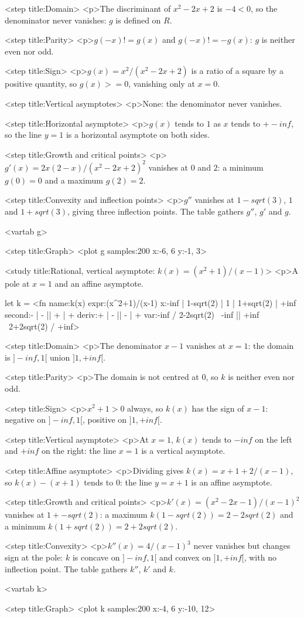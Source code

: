 \documentclass[margins=15, size=12, lang=en]{scholatex}
\begin{document}
<step title:{Domain}>{
<p>The discriminant of $x^2 - 2x + 2$ is $-4 < 0$, so the denominator
never vanishes: $g$ is defined on $R$.
}

<step title:{Parity}>{
<p>$g(-x) != g(x)$ and $g(-x) != -g(x)$: $g$ is neither even nor
odd.
}

<step title:{Sign}>{
<p>$g(x) = x^2 / (x^2 - 2x + 2)$ is a ratio of a square by a positive
quantity, so $g(x) >= 0$, vanishing only at $x = 0$.
}

<step title:{Vertical asymptotes}>{
<p>None: the denominator never vanishes.
}

<step title:{Horizontal asymptote}>{
<p>$g(x)$ tends to $1$ as $x$ tends to $+- inf$, so the line $y = 1$
is a horizontal asymptote on both sides.
}

<step title:{Growth and critical points}>{
<p>$g'(x) = 2x(2-x)/(x^2-2x+2)^2$ vanishes at $0$ and $2$: a minimum
$g(0) = 0$ and a maximum $g(2) = 2$.
}

<step title:{Convexity and inflection points}>{
<p>$g''$ vanishes at $1-sqrt(3)$, $1$ and $1+sqrt(3)$, giving three
inflection points. The table gathers $g''$, $g'$ and $g$.
}

<vartab g>

<step title:{Graph}>{
<plot g samples:200 x:{-6, 6} y:{-1, 3}>
}

<study title:{Rational, vertical asymptote: $k(x) = (x^2+1)/(x-1)$}>{
<p>A pole at $x = 1$ and an affine asymptote.
}

let k = <fn name:{k(x)}
            expr:{(x^2+1)/(x-1)}
            x:{-inf | 1-sqrt(2) | 1 | 1+sqrt(2) | +inf}
            second:{- | - || + | +}
            deriv:{+ | - || - | +}
            var:{-inf / 2-2sqrt(2) \ -inf || +inf \ 2+2sqrt(2) / +inf}>

<step title:{Domain}>{
<p>The denominator $x - 1$ vanishes at $x = 1$: the domain is
$]-inf, 1[$ union $]1, +inf[$.
}

<step title:{Parity}>{
<p>The domain is not centred at $0$, so $k$ is neither even nor odd.
}

<step title:{Sign}>{
<p>$x^2 + 1 > 0$ always, so $k(x)$ has the sign of $x - 1$: negative on
$]-inf, 1[$, positive on $]1, +inf[$.
}

<step title:{Vertical asymptote}>{
<p>At $x = 1$, $k(x)$ tends to $-inf$ on the left and $+inf$ on the
right: the line $x = 1$ is a vertical asymptote.
}

<step title:{Affine asymptote}>{
<p>Dividing gives $k(x) = x + 1 + 2/(x-1)$, so $k(x) - (x+1)$ tends to
$0$: the line $y = x + 1$ is an affine asymptote.
}

<step title:{Growth and critical points}>{
<p>$k'(x) = (x^2-2x-1)/(x-1)^2$ vanishes at $1 +- sqrt(2)$: a maximum
$k(1-sqrt(2)) = 2 - 2sqrt(2)$ and a minimum $k(1+sqrt(2)) = 2 + 2sqrt(2)$.
}

<step title:{Convexity}>{
<p>$k''(x) = 4/(x-1)^3$ never vanishes but changes sign at the pole:
$k$ is concave on $]-inf, 1[$ and convex on $]1, +inf[$, with no
inflection point. The table gathers $k''$, $k'$ and $k$.
}

<vartab k>

<step title:{Graph}>{
<plot k samples:200 x:{-4, 6} y:{-10, 12}>
}
\end{document}
